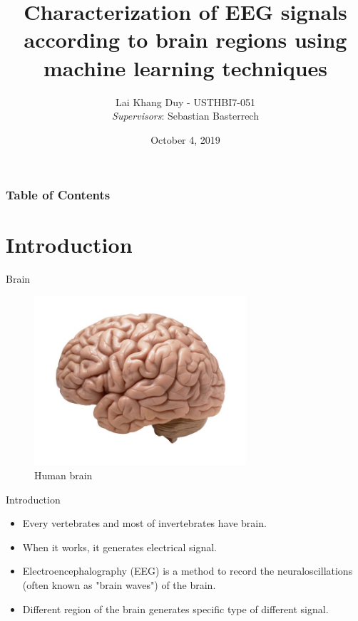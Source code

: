 \documentclass[xcolor=dvipsnames]{beamer} %
\title[EEGSignal]{Characterization of EEG signals according to brain regions using machine learning techniques}
\author[Lai Khang Duy]{Lai Khang Duy - USTHBI7-051 \texorpdfstring{ \\ [4mm] 
		{\small \textit{Supervisors}: Sebastian Basterrech}}{}}
\institute[]{ICT Department - University of Science and Technology of Hanoi}
\date{October 4, 2019}
\begin{document}
	\frame{\titlepage}
	
	\begin{frame}
		\frametitle{Table of Contents}
		\tableofcontents
	\end{frame}

	\section{Introduction}
	
	\begin{frame}{Brain}
		\begin{figure}
		    \centering
		    \includegraphics[width=0.7\textwidth]{images/brain1.jpg}
		    \caption{Human brain}
		    \label{fig:brain}
		\end{figure}
	\end{frame}
	
	\begin{frame}{Introduction}
	    \begin{itemize}
	        \item Every vertebrates and most of invertebrates have brain.
	        \item When it works, it generates electrical signal.
	        \item Electroencephalography (EEG) is a method to record the neuraloscillations (often known as "brain waves") of the brain.
	        \item Different region of the brain generates specific type of different signal.
	    \end{itemize}
	\end{frame}
	
\end{document}
